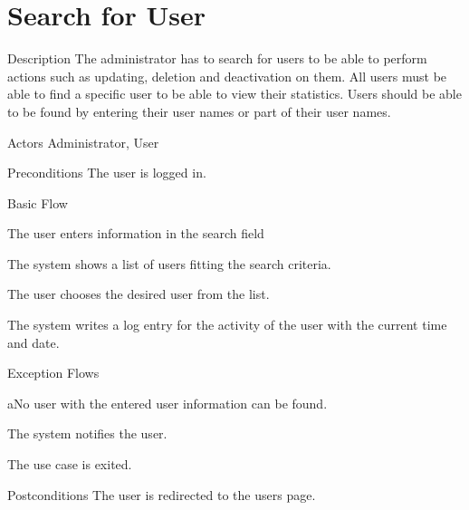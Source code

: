 \section{Search for User}

%
\begin{cpart}{Description}
The administrator has to search for users to be able to perform actions such as updating, deletion and deactivation on them. All users must be able to find a specific user to be able to view their statistics. Users should be able to be found by entering their user names or part of their user names.
\end{cpart}


%
\begin{cpart}{Actors}
Administrator, User
\end{cpart}

%
\begin{cpart}{Preconditions}
The user is logged in.
\end{cpart}

%
\begin{cpartList}{Basic Flow}
  \item The user enters information in the search field
  \item The system shows a list of users fitting the search criteria.
  \item The user chooses the desired user from the list.
  \item The system writes a log entry for the activity of the user with the current time and date.
\end{cpartList}

%
\begin{cpartList}{Exception Flows}
  \begin{innerList}{4}{a}{No user with the entered user information can be found.}
    \item The system notifies the user.
    \item The use case is exited.
  \end{innerList}
\end{cpartList}

%
\begin{cpart}{Postconditions}
The user is redirected to the users page.
\end{cpart}

\clearpage
